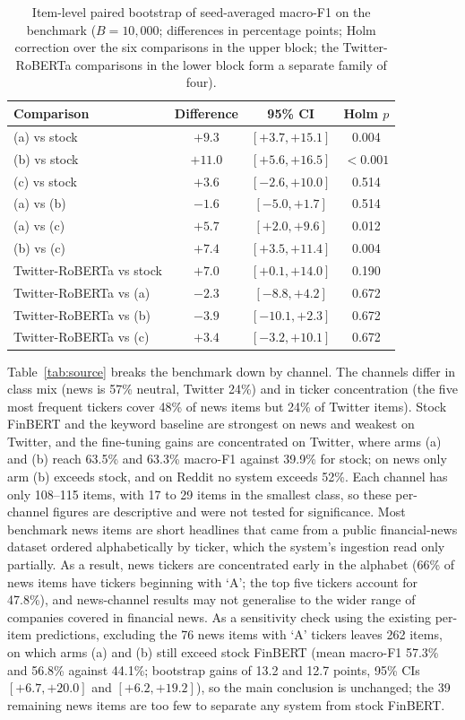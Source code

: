 \documentclass{aims}
\numberwithin{equation}{section}
\begin{document}
\begin{table}[ht]
\centering
\caption{Item-level paired bootstrap of seed-averaged macro-F1 on the benchmark
($B = 10{,}000$; differences in percentage points; Holm correction over the six
comparisons in the upper block; the Twitter-RoBERTa comparisons in the lower block
form a separate family of four).}
\label{tab:boot}
\begin{tabular}{lccc}
\toprule
\textbf{Comparison} & \textbf{Difference} & \textbf{95\% CI} & \textbf{Holm $p$} \\
\midrule
(a) vs stock & $+9.3$ & $[+3.7, +15.1]$ & 0.004 \\
(b) vs stock & $+11.0$ & $[+5.6, +16.5]$ & $<0.001$ \\
(c) vs stock & $+3.6$ & $[-2.6, +10.0]$ & 0.514 \\
(a) vs (b) & $-1.6$ & $[-5.0, +1.7]$ & 0.514 \\
(a) vs (c) & $+5.7$ & $[+2.0, +9.6]$ & 0.012 \\
(b) vs (c) & $+7.4$ & $[+3.5, +11.4]$ & 0.004 \\
\midrule
Twitter-RoBERTa vs stock & $+7.0$ & $[+0.1, +14.0]$ & 0.190 \\
Twitter-RoBERTa vs (a) & $-2.3$ & $[-8.8, +4.2]$ & 0.672 \\
Twitter-RoBERTa vs (b) & $-3.9$ & $[-10.1, +2.3]$ & 0.672 \\
Twitter-RoBERTa vs (c) & $+3.4$ & $[-3.2, +10.1]$ & 0.672 \\
\bottomrule
\end{tabular}
\end{table}

Table~\ref{tab:source} breaks the benchmark down by channel. The channels differ
in class mix (news is 57\% neutral, Twitter 24\%) and in ticker concentration (the
five most frequent tickers cover 48\% of news items but 24\% of Twitter items).
Stock FinBERT and the keyword baseline are strongest on news and weakest on Twitter,
and the fine-tuning gains are concentrated on Twitter, where arms (a) and (b) reach
63.5\% and 63.3\% macro-F1 against 39.9\% for stock; on news only arm (b) exceeds
stock, and on Reddit no system exceeds 52\%. Each channel has only 108--115 items,
with 17 to 29 items in the smallest class, so these per-channel figures are
descriptive and were not tested for significance.
Most benchmark news items are short headlines that came from a public financial-news
dataset ordered alphabetically by ticker, which the system's ingestion read only
partially. As a result, news tickers are concentrated early in the alphabet (66\% of
news items have tickers beginning with `A'; the top five tickers account for 47.8\%),
and news-channel results may not generalise to the wider range of companies covered in
financial news. As a sensitivity check using the existing per-item predictions,
excluding the 76 news items with `A' tickers leaves 262 items, on which arms (a) and (b)
still exceed stock FinBERT (mean macro-F1 57.3\% and 56.8\% against 44.1\%; bootstrap
gains of 13.2 and 12.7 points, 95\% CIs $[+6.7, +20.0]$ and $[+6.2, +19.2]$), so the
main conclusion is unchanged; the 39 remaining news items are too few to separate any
system from stock FinBERT.
\end{document}
